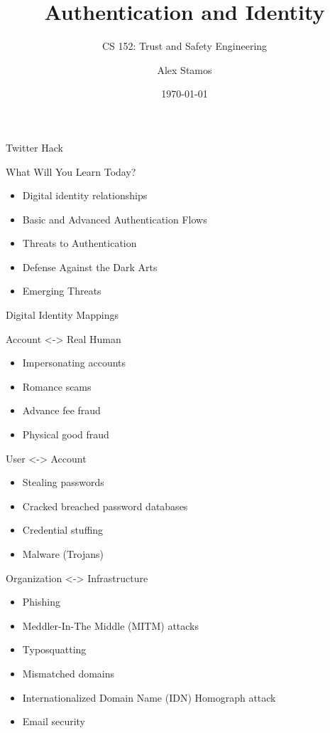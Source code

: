 \documentclass[nobackground,dvipsnames,table]{beamer}
\title{Authentication and Identity}
\subtitle{CS 152: Trust and Safety Engineering}
\author[A. Stamos]{Alex Stamos}
\institute[SIO]{\large Stanford Internet Observatory}
\date[2022]{\today}
\begin{document}
\coverpage

\begin{frame}
    \titlepage
\end{frame}

\begin{frame}{Twitter Hack}
    
\end{frame}

\begin{frame}{What Will You Learn Today?}
    \begin{itemize}
        \item Digital identity relationships
        \item Basic and Advanced Authentication Flows
        \item Threats to Authentication
        \item Defense Against the Dark Arts
        \item Emerging Threats
    \end{itemize}
\end{frame}

\begin{frame}{Digital Identity Mappings}
\end{frame}

\begin{frame}{Account <-> Real Human}
    \begin{itemize}
        \item Impersonating accounts
        \item Romance scams
        \item Advance fee fraud
        \item Physical good fraud
    \end{itemize}
\end{frame}

\begin{frame}{User <-> Account}
    \begin{itemize}
        \item Stealing passwords
        \item Cracked breached password databases
        \item Credential stuffing
        \item Malware (Trojans)
    \end{itemize}
\end{frame}

\begin{frame}{Organization <-> Infrastructure }
    \begin{itemize}
        \item Phishing 
        \item Meddler-In-The Middle (MITM) attacks
        \item Typosquatting
        \item Mismatched domains
        \item Internationalized Domain Name (IDN) Homograph attack
        \item Email security
    \end{itemize}
\end{frame}
\end{document}
